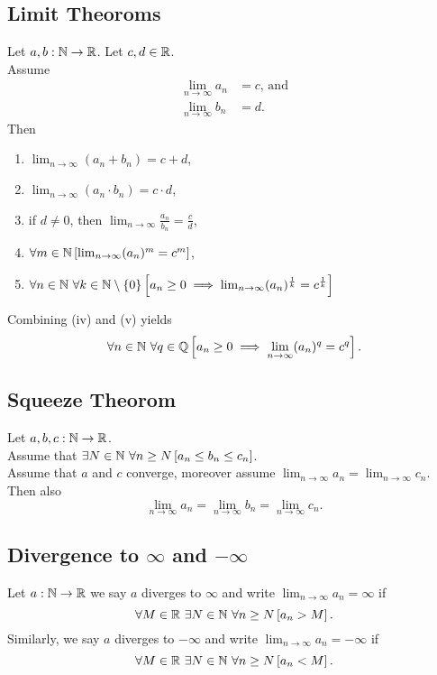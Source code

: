 \subsection{Limit Theoroms}
\uthm Let $a,b : \mathbb{N} \to \mathbb{R}$. Let $c,d \in \mathbb{R}$.\\
Assume
\begin{align*}
    \lim_{n \to \infty} a_n &= c \text{, and}\\
    \lim_{n \to \infty} b_n &= d.
\end{align*}
Then
\begin{enumerate}
    \item $\lim_{n \to \infty} ( a_n + b_n ) = c + d$,
    \item $\lim_{n \to \infty} ( a_n \cdot b_n) = c \cdot d$,
    \item if $d \neq 0$, then $\lim_{n \to \infty} \frac{a_n}{b_n} = \frac{c}{d}$,
    \item $\forall m \in \mathbb{N} \left[ \lim_{n \to \infty} (a_n)^m = c^m \right]$,
    \item $\forall n \in \mathbb{N}\ \forall k \in \mathbb{N} \setminus \{0\} \left[ a_n \geq 0 \implies
        \lim_{n \to \infty} (a_n)^{\frac{1}{k}} = c^{\frac{1}{k}} \right]$
\end{enumerate}
Combining (iv) and (v) yields
\[
    \forall n \in \mathbb{N}\ \forall q \in \mathbb{Q} \left[
        a_n \geq 0 \implies \lim_{n \to \infty} (a_n)^q = c^q \right].
\]


\subsection{Squeeze Theorom}
\uthm Let $a,b,c : \mathbb{N} \to \mathbb{R}$.\\
Assume that $\exists N \in \mathbb{N}\ \forall n \geq N \left[ a_n \leq b_n \leq c_n \right]$.\\
Assume that $a$ and $c$ converge, moreover assume
    $\lim_{n \to \infty} a_n = \lim_{n \to \infty} c_n$.\\
Then also
\[
    \lim_{n \to \infty} a_n = \lim_{n \to \infty} b_n = \lim_{n \to \infty} c_n.
\]


\subsection{Divergence to $\infty$ and $-\infty$}
\udef Let $a : \mathbb{N} \to \mathbb{R}$ we say $a$ diverges to $\infty$ and write
$\lim_{n \to \infty} a_n = \infty$ if
\[
    \forall M \in \R\ \exists N \in \N\ \forall n \geq N \left[
    a_n > M \right].
\]
Similarly, we say $a$ diverges to $-\infty$ and write
$\lim_{n \to \infty} a_n = -\infty$ if
\[
    \forall M \in \R\ \exists N \in \N\ \forall n \geq N \left[
    a_n < M \right].
\]

